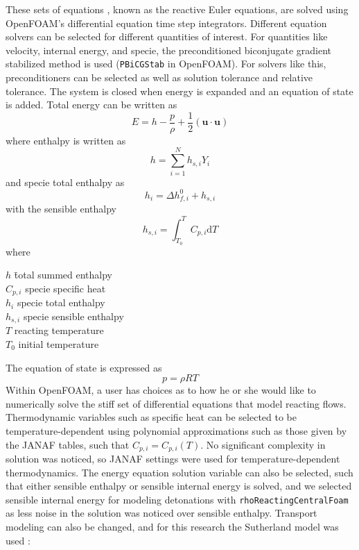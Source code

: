 \noindent These sets of equations \cite{kuo}, known as the reactive Euler equations, are solved using OpenFOAM's differential equation time step integrators. Different equation solvers can be selected for different quantities of interest. For quantities like velocity, internal energy, and specie, the preconditioned biconjugate gradient stabilized method is used (\verb|PBiCGStab| in OpenFOAM). For solvers like this, preconditioners can be selected as well as solution tolerance and relative tolerance. The system is closed when energy is expanded and an equation of state is added. Total energy \cite{kuo} can be written as 
\begin{equation}
E = h - \frac{p}{\rho} +\frac{1}{2} \left(\bm{u}\cdot\bm{u}\right)
\end{equation}
where enthalpy is written \cite{kuo} as 
\begin{equation}
h = \sum_{i = 1}^Nh_{s,i}Y_i
\end{equation}
and specie total enthalpy \cite{kuo} as 
\begin{equation}
h_{i} = \Delta h_{f,i}^0 + h_{s,i}
\end{equation}
with the sensible enthalpy 
\begin{equation}
h_{s,i} = \int_{T_0}^T C_{p,i}\mathrm{d}T
\end{equation}
where 
\begin{tabbing}
\qquad \= \(h\) \qquad \= total summed enthalpy\\ 
\> \(C_{p,i}\) \> specie specific heat\\
\> \(h_i\) \> specie total enthalpy \\
\> \(h_{s,i}\) \> specie sensible enthalpy \\
\> \(T\) \> reacting temperature \\
\> \(T_0\) \> initial temperature 
\end{tabbing}
The equation of state is expressed as 
\begin{equation}
p = \rho R T
\end{equation}
Within OpenFOAM, a user has choices as to how he or she would like to numerically solve the stiff set of differential equations that model reacting flows. Thermodynamic variables such as specific heat can be selected to be temperature-dependent using polynomial approximations such as those given by the JANAF tables, such that \(C_{p,i} = C_{p,i}(T)\). No significant complexity in solution was noticed, so JANAF settings were used for temperature-dependent thermodynamics. The energy equation solution variable can also be selected, such that either sensible enthalpy or sensible internal energy is solved, and we selected sensible internal energy for modeling detonations with \verb|rhoReactingCentralFoam| as less noise in the solution was noticed over sensible enthalpy. Transport modeling can also be changed, and for this research the Sutherland model was used \cite{ofug}:
